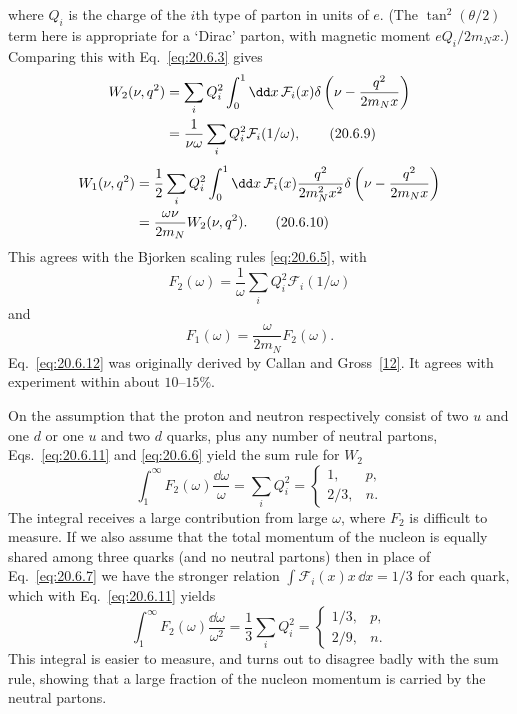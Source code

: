 where $Q_i$ is the charge of the $i$th type of parton in units of $e$. (The $\tan^2(\theta/2)$ term here is appropriate for a `Dirac' parton, with magnetic moment $eQ_i/2m_Nx$.) Comparing this with Eq.~\eqref{eq:20.6.3} gives
\begin{align}
W_2(\nu,q^2)
&=\sum_iQ_i^2\int_0^1\dd x\,\mathcal F_i(x)
\delta\left(\nu-\frac{q^2}{2m_Nx}\right)
\notag\\
&=\frac{1}{\nu\omega}
\sum_iQ_i^2\mathcal F_i(1/\omega),
\tag{20.6.9}\label{eq:20.6.9}
\end{align}
\begin{align}
W_1(\nu,q^2)
&=\frac12\sum_iQ_i^2\int_0^1\dd x\,\mathcal F_i(x)
\frac{q^2}{2m_N^2x^2}
\delta\left(\nu-\frac{q^2}{2m_Nx}\right)
\notag\\
&=\frac{\omega\nu}{2m_N}W_2(\nu,q^2).
\tag{20.6.10}\label{eq:20.6.10}
\end{align}
This agrees with the Bjorken scaling rules \eqref{eq:20.6.5}, with
\begin{equation}
F_2(\omega)=\frac1\omega
\sum_iQ_i^2\mathcal F_i(1/\omega)
\tag{20.6.11}\label{eq:20.6.11}
\end{equation}
and
\begin{equation}
F_1(\omega)=\frac{\omega}{2m_N}F_2(\omega).
\tag{20.6.12}\label{eq:20.6.12}
\end{equation}
Eq.~\eqref{eq:20.6.12} was originally derived by Callan and Gross~\hyperref[ch20-ref-12]{[12]}. It agrees with experiment within about $10$--$15\%$.

On the assumption that the proton and neutron respectively consist of two $u$ and one $d$ or one $u$ and two $d$ quarks, plus any number of neutral partons, Eqs.~\eqref{eq:20.6.11} and \eqref{eq:20.6.6} yield the sum rule for $W_2$
\begin{equation}
\int_1^\infty F_2(\omega)\frac{\dd\omega}{\omega}
=\sum_iQ_i^2
=
\begin{cases}
1,&p,\\[2pt]
2/3,&n.
\end{cases}
\tag{20.6.13}\label{eq:20.6.13}
\end{equation}
The integral receives a large contribution from large $\omega$, where $F_2$ is difficult to measure. If we also assume that the total momentum of the nucleon is equally shared among three quarks (and no neutral partons) then in place of Eq.~\eqref{eq:20.6.7} we have the stronger relation $\int\mathcal F_i(x)x\,\dd x=1/3$ for each quark, which with Eq.~\eqref{eq:20.6.11} yields
\[
\int_1^\infty F_2(\omega)\frac{\dd\omega}{\omega^2}
=\frac13\sum_iQ_i^2
=
\begin{cases}
1/3,&p,\\[2pt]
2/9,&n.
\end{cases}
\]
This integral is easier to measure, and turns out to disagree badly with the sum rule, showing that a large fraction of the nucleon momentum is carried by the neutral partons.

